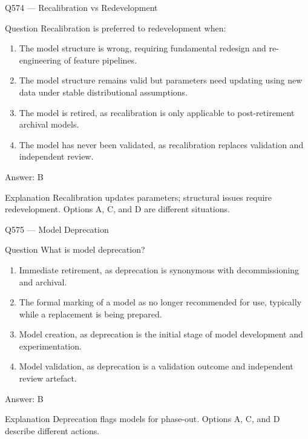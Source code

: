 \documentclass[aspectratio=169,8pt]{beamer}
\begin{document}
	\begin{frame}{Q574 --- Recalibration vs Redevelopment}
		\begin{block}{Question}
			Recalibration is preferred to redevelopment when:
			\begin{enumerate}
				\item The model structure is wrong, requiring fundamental redesign and re-engineering of feature pipelines.
				\item The model structure remains valid but parameters need updating using new data under stable distributional assumptions.
				\item The model is retired, as recalibration is only applicable to post-retirement archival models.
				\item The model has never been validated, as recalibration replaces validation and independent review.
			\end{enumerate}
		\end{block}
		\begin{exampleblock}{Answer: B}\end{exampleblock}
		\begin{block}{Explanation}
			Recalibration updates parameters; structural issues require redevelopment. Options A, C, and D are different situations.
		\end{block}
	\end{frame}
	
	\begin{frame}{Q575 --- Model Deprecation}
		\begin{block}{Question}
			What is model deprecation?
			\begin{enumerate}
				\item Immediate retirement, as deprecation is synonymous with decommissioning and archival.
				\item The formal marking of a model as no longer recommended for use, typically while a replacement is being prepared.
				\item Model creation, as deprecation is the initial stage of model development and experimentation.
				\item Model validation, as deprecation is a validation outcome and independent review artefact.
			\end{enumerate}
		\end{block}
		\begin{exampleblock}{Answer: B}\end{exampleblock}
		\begin{block}{Explanation}
			Deprecation flags models for phase-out. Options A, C, and D describe different actions.
		\end{block}
	\end{frame}
	
\end{document}
